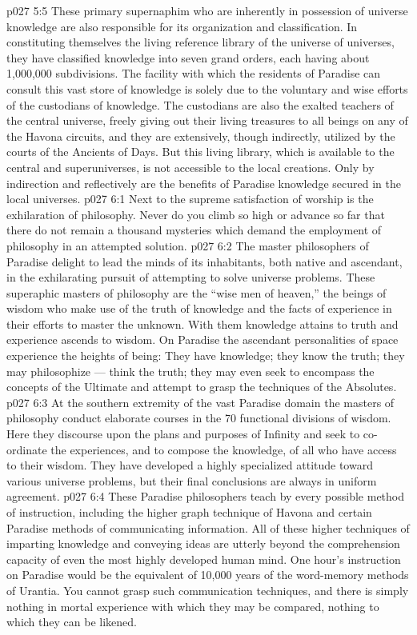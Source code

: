 \vs p027 5:5 These primary supernaphim who are inherently in possession of universe knowledge are also responsible for its organization and classification. In constituting themselves the living reference library of the universe of universes, they have classified knowledge into seven grand orders, each having about 1,000,000 subdivisions. The facility with which the residents of Paradise can consult this vast store of knowledge is solely due to the voluntary and wise efforts of the custodians of knowledge. The custodians are also the exalted teachers of the central universe, freely giving out their living treasures to all beings on any of the Havona circuits, and they are extensively, though indirectly, utilized by the courts of the Ancients of Days. But this living library, which is available to the central and superuniverses, is not accessible to the local creations. Only by indirection and reflectively are the benefits of Paradise knowledge secured in the local universes.
\vs p027 6:1 Next to the supreme satisfaction of worship is the exhilaration of philosophy. Never do you climb so high or advance so far that there do not remain a thousand mysteries which demand the employment of philosophy in an attempted solution.
\vs p027 6:2 The master philosophers of Paradise delight to lead the minds of its inhabitants, both native and ascendant, in the exhilarating pursuit of attempting to solve universe problems. These superaphic masters of philosophy are the “wise men of heaven,” the beings of wisdom who make use of the truth of knowledge and the facts of experience in their efforts to master the unknown. With them knowledge attains to truth and experience ascends to wisdom. On Paradise the ascendant personalities of space experience the heights of being: They have knowledge; they know the truth; they may philosophize --- think the truth; they may even seek to encompass the concepts of the Ultimate and attempt to grasp the techniques of the Absolutes.
\vs p027 6:3 At the southern extremity of the vast Paradise domain the masters of philosophy conduct elaborate courses in the 70 functional divisions of wisdom. Here they discourse upon the plans and purposes of Infinity and seek to co\hyp{}ordinate the experiences, and to compose the knowledge, of all who have access to their wisdom. They have developed a highly specialized attitude toward various universe problems, but their final conclusions are always in uniform agreement.
\vs p027 6:4 These Paradise philosophers teach by every possible method of instruction, including the higher graph technique of Havona and certain Paradise methods of communicating information. All of these higher techniques of imparting knowledge and conveying ideas are utterly beyond the comprehension capacity of even the most highly developed human mind. One hour’s instruction on Paradise would be the equivalent of 10,000 years of the word\hyp{}memory methods of Urantia. You cannot grasp such communication techniques, and there is simply nothing in mortal experience with which they may be compared, nothing to which they can be likened.
